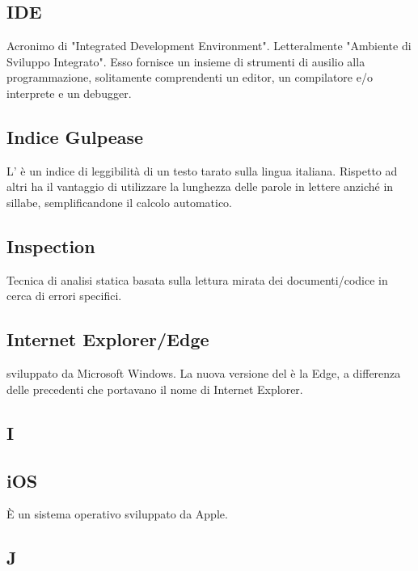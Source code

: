 \subsection*{IDE}
Acronimo di "Integrated Development Environment". Letteralmente "Ambiente
di Sviluppo Integrato". Esso fornisce un insieme di strumenti di ausilio
alla programmazione, solitamente comprendenti un editor, un compilatore e/o
interprete e un debugger.

\subsection*{Indice Gulpease}
L' è un indice di leggibilità di un testo tarato sulla lingua
italiana. Rispetto ad altri ha il vantaggio di utilizzare la lunghezza delle parole in lettere
anziché in sillabe, semplificandone il calcolo automatico.

\subsection*{Inspection }
Tecnica di analisi statica basata sulla lettura mirata dei documenti/codice in cerca di
errori specifici.

\subsection*{Internet Explorer/Edge}
  sviluppato da Microsoft Windows. La nuova versione del  è la Edge, a differenza delle precedenti che portavano il nome di Internet Explorer.

\newpage

\begin{center}
\Huge\section*{\uppercase{i}}
\end{center}

\subsection*{iOS}
È un sistema operativo sviluppato da Apple.

\newpage

\begin{center}
\Huge\section*{\uppercase{J}}
\end{center}

